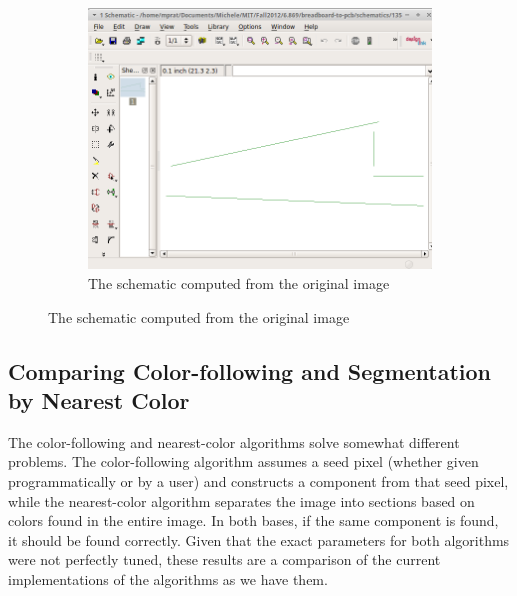 \documentclass[10pt,twocolumn,letterpaper]{article}
\begin{document}
\begin{figure}[ht]
\begin{subfigure}[b]{\linewidth}
	\centering
   \includegraphics[width=0.9\linewidth]{demos/full_pipeline2_schematic.png}
	\caption{The schematic computed from the original image}
	\label{fig:schemfull}
\end{subfigure}
\end{figure}

\subsection{Comparing Color-following and Segmentation by Nearest Color}

The color-following and nearest-color algorithms solve somewhat different
problems. The color-following algorithm assumes a seed pixel (whether given
programmatically or by a user) and constructs a component from that seed pixel,
while the nearest-color algorithm separates the image into sections based on
colors found in the entire image. In both bases, if the same component is
found, it should be found correctly. Given that the exact parameters for both
algorithms were not perfectly tuned, these results are a comparison of the
current implementations of the algorithms as we have them.
\end{document}

